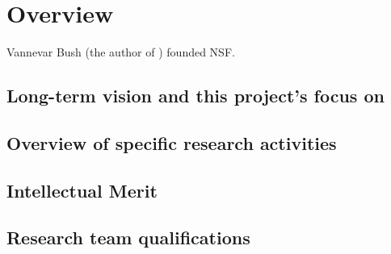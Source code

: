 
\section{Overview}

Vannevar Bush (the author of \cite{bush1945we}) founded NSF.

\subsection{Long-term vision and this project's focus on \xx}

\subsection{Overview of specific research activities}

\subsection{Intellectual Merit}

\subsection{Research team qualifications}